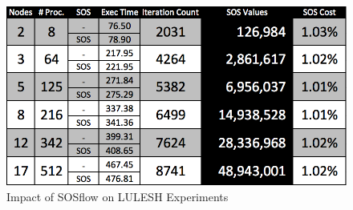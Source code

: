 \begin{figure}[!t]
\centering
\includegraphics[width=5in]{images/cori_results.png}
\caption{Impact of SOSflow on LULESH Experiments}
\label{cori_results}
\end{figure}

